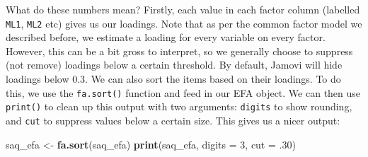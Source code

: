 \documentclass[
]{book}
\newenvironment{Shaded}{\begin{snugshade}}{\end{snugshade}}
\newcommand{\AttributeTok}[1]{\textcolor[rgb]{0.13,0.29,0.53}{#1}}
\newcommand{\DecValTok}[1]{\textcolor[rgb]{0.00,0.00,0.81}{#1}}
\newcommand{\FunctionTok}[1]{\textcolor[rgb]{0.13,0.29,0.53}{\textbf{#1}}}
\newcommand{\NormalTok}[1]{#1}
\newcommand{\OtherTok}[1]{\textcolor[rgb]{0.56,0.35,0.01}{#1}}
\begin{document}
What do these numbers mean? Firstly, each value in each factor column (labelled \texttt{ML1}, \texttt{ML2} etc) gives us our loadings. Note that as per the common factor model we described before, we estimate a loading for every variable on every factor. However, this can be a bit gross to interpret, so we generally choose to suppress (not remove) loadings below a certain threshold. By default, Jamovi will hide loadings below 0.3. We can also sort the items based on their loadings. To do this, we use the \texttt{fa.sort()} function and feed in our EFA object. We can then use \texttt{print()} to clean up this output with two arguments: \texttt{digits} to show rounding, and \texttt{cut} to suppress values below a certain size. This gives us a nicer output:

\begin{Shaded}
\begin{Highlighting}[]
\NormalTok{saq\_efa }\OtherTok{\textless{}{-}} \FunctionTok{fa.sort}\NormalTok{(saq\_efa) }
\FunctionTok{print}\NormalTok{(saq\_efa, }\AttributeTok{digits =} \DecValTok{3}\NormalTok{, }\AttributeTok{cut =}\NormalTok{ .}\DecValTok{30}\NormalTok{)}
\end{Highlighting}
\end{Shaded}
\end{document}
